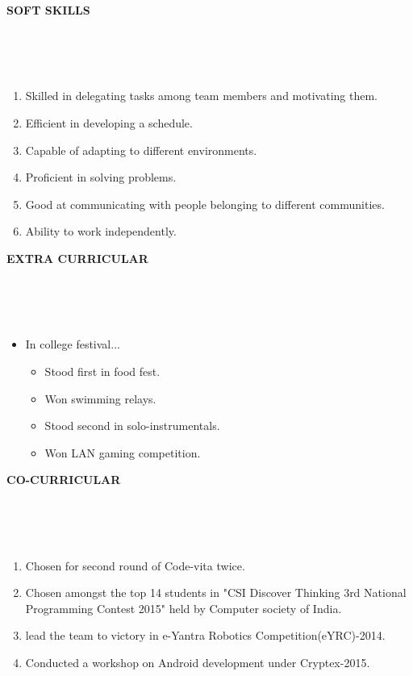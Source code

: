 \documentclass[a4paper,10pt]{article}
\newcommand{\lsep}{-0.5cm}
\newcommand{\resheading}[1]{{\small \colorbox{mygrey}{\begin{minipage}{0.975\textwidth}{\textbf{#1 \vphantom{p\^{E}}}}\end{minipage}}}}
\begin{document}
\resheading{\textbf{SOFT SKILLS} }\\[\lsep]
\\ \\
\begin{enumerate}
		\item \noindent Skilled in delegating tasks among team members and motivating them.
		\item \noindent Efficient in developing a schedule.
		\item \noindent Capable of adapting to different environments.
		\item \noindent Proficient in solving problems.
		\item \noindent Good at communicating with people belonging to different communities.
		\item \noindent Ability to work independently.
\end{enumerate}

\resheading{\textbf{EXTRA CURRICULAR} }\\[\lsep]
\\ \\


\begin{itemize}
		\item \noindent In college festival...
		\begin{itemize}
			\item Stood first in food fest.
			\item Won swimming relays.
			\item Stood second in solo-instrumentals.
			\item Won LAN gaming competition.
		\end{itemize}
\end{itemize}

\resheading{\textbf{CO-CURRICULAR} }\\[\lsep]
\\ \\
\begin{enumerate}
			\item \noindent Chosen for second round of Code-vita twice.
			\item \noindent Chosen amongst the top 14 students in "CSI Discover Thinking 3rd National Programming Contest 2015" held by Computer society of India.
			\item \noindent lead the team to victory in e-Yantra Robotics Competition(eYRC)-2014.
			\item \noindent Conducted a workshop on Android development under Cryptex-2015.
\end{enumerate}
\end{document}
